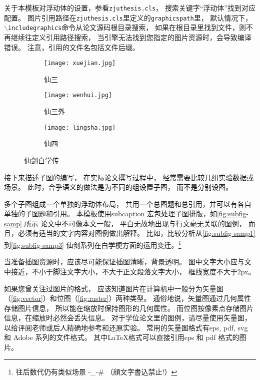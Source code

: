 关于本模板对浮动体的设置，参看\texttt{zjuthesis.cls}，
搜索关键字“浮动体”找到对应配置。
图片引用路径在\texttt{zjuthesis.cls}里定义的\texttt{graphicspath}里，
默认情况下，\texttt{$\backslash$includegraphics}命令从论文源码根目录搜索，
如果在根目录里找到文件，则不再继续往定义引用路径搜索，
当引擎无法找到您指定的图片资源时，会导致编译错误。
注意，引用的文件名包括文件后缀。

\begin{figure}[htbp]
	\centering
	\begin{subfigure}[b]{.45\textwidth}  %
		\centering
		\texttt{[image: xuejian.jpg]}
		\caption{仙三}\label{fig:subfig-samp1}
	\end{subfigure}
	\begin{subfigure}[b]{.45\textwidth}
		\centering
		\texttt{[image: wenhui.jpg]}
		\caption{仙三外}\label{fig:subfig-samp2}
	\end{subfigure}
	\begin{subfigure}[b]{.45\textwidth}
		\centering
		\texttt{[image: lingsha.jpg]}
		\caption{仙四}\label{fig:subfig-samp3}
	\end{subfigure}
	\caption{仙剑白学传}\label{fig:subfig-samp}
\end{figure}

接下来描述子图的编写，
在实际论文撰写过程中，
经常需要比较几组实验数据或场景。
此时，合乎语义的做法是为不同的组设置子图，
而不是分别设图。

多个子图组成一个单独的浮动体布局，
共用一个总图题和总引用，并可以有各自单独的子图题和引用。
本模板使用subcaption 宏包处理子图排版，如\autoref{fig:subfig-samp} 所示
论文中不可像本文一般，
平白无故地出现与行文毫无关联的图例，
而且，必须有适当的文字内容对图例做出解释。
比如，比较分析从\autoref{fig:subfig-samp1} 到\autoref{fig:subfig-samp3}
仙剑系列在白学梗方面的运用变迁。\footnote{往后数代仍有类似场景 -\_-\# （顔文字書込禁止!）}

当准备插图资源时，应该尽可能保证插图清晰，背景透明。
图中文字大小应与文中接近，不小于脚注文字大小，不大于正文段落文字大小，
框线宽度不大于2px。

如果您曾关注过图片的格式，
应该知道图片在计算机中一般分为矢量图（\autoref{fig:vector}）和位图（\autoref{fig:raster}）两种类型。
通俗地说，矢量图通过几何属性存储图片信息，
所以能在缩放时保持图形的几何属性。
而位图按像素点存储图片信息，在缩放时必然会丢失信息。
对于学位论文里的图例，请尽量使用矢量图，
以给评阅老师或后人精确地参考和还原实验。
常用的矢量图格式有eps, pdf, svg 和 Adobe 系列的文件格式。
其中\LaTeX 格式可以直接引用eps 和 pdf 格式的图片。

